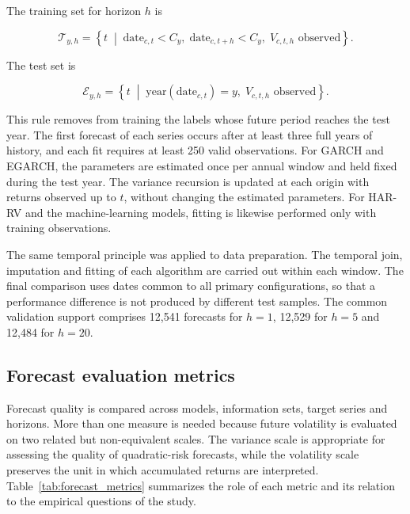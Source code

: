 \documentclass[a4paper,fleqn]{cas-sc}
\begin{document}
The training set for horizon \(h\) is

\begin{equation}
\mathcal{T}_{y,h}
=
\left\{
t
\;\middle|\;
\text{date}_{c,t}<C_y,\;
\text{date}_{c,t+h}<C_y,\;
V_{c,t,h}\text{ observed}
\right\}.
\label{eq:train_set}
\end{equation}

The test set is

\begin{equation}
\mathcal{E}_{y,h}
=
\left\{
t
\;\middle|\;
\text{year}(\text{date}_{c,t})=y,\;
V_{c,t,h}\text{ observed}
\right\}.
\label{eq:test_set}
\end{equation}

This rule removes from training the labels whose future period reaches the test year. The first forecast of each series occurs after at least three full years of history, and each fit requires at least 250 valid observations. For GARCH and EGARCH, the parameters are estimated once per annual window and held fixed during the test year. The variance recursion is updated at each origin with returns observed up to \(t\), without changing the estimated parameters. For HAR-RV and the machine-learning models, fitting is likewise performed only with training observations.

The same temporal principle was applied to data preparation. The temporal join, imputation and fitting of each algorithm are carried out within each window. The final comparison uses dates common to all primary configurations, so that a performance difference is not produced by different test samples. The common validation support comprises 12,541 forecasts for \(h=1\), 12,529 for \(h=5\) and 12,484 for \(h=20\).

\subsection{Forecast evaluation metrics}
\label{subsec:metrics}

Forecast quality is compared across models, information sets, target series and horizons. More than one measure is needed because future volatility is evaluated on two related but non-equivalent scales. The variance scale is appropriate for assessing the quality of quadratic-risk forecasts, while the volatility scale preserves the unit in which accumulated returns are interpreted. Table~\ref{tab:forecast_metrics} summarizes the role of each metric and its relation to the empirical questions of the study.
\end{document}
